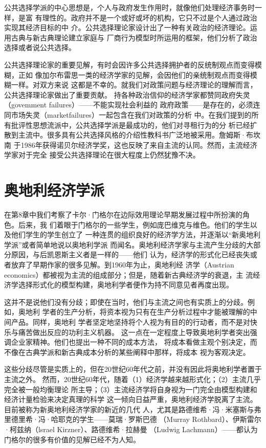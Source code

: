 公共选择学派的中心思想是，个人与政府发生作用时，就像他们处理经济事务时一样，是富
有理性的。政府并不是一个或好或坏的机构，它只不过是个人通过政治实现其经济目标的中
介。公共选择理论家设计出了一种有关政治的经济理论。运用古典与新古典理论建立家庭与
厂商行为模型时所运用的框架，他们分析了政治选择或者说公共选择。

公共选择理论家的重要见解，有时会因许多公共选择拥护者的反统制观点而变得模糊，正如
像加尔布雷思一类的经济学家的见解，会因他们的亲统制观点而变得模糊一样。对双方来说
这都是不幸的。就我们对政策问题与经济理论的理解而言，公共选择理论家做出了重要贡献。
持各种政治信仰的经济学家都赞同政府失灵（govemment failures）——不能实现社会利益的
政府政策——是存在的，必须连同市场失灵（marketfailures）一起包含在我们对政策的分析
中。在我们提到的所有批评性思想流派中，公共选择学派是最成功的，他们对寻租行为的分
析已经扩散到主流中。很多具有公共选择风格的介绍性教科书广泛地被采用。詹姆斯·布坎南
于1986年获得诺贝尔经济学奖，这也反映了来自主流的认同。然而，主流经济学家对于完全
接受公共选择理论在很大程度上仍然犹豫不决。


\section{奥地利经济学派}

在第8章中我们考察了卡尔·门格尔在边际效用理论早期发展过程中所扮演的角色。后来，我
们着眼于门格尔的一些学生，例如庞巴维克与维色。他们的学生以及他们学生的学生创立了
一种连贯的组织良好的经济学方法，并逐渐以“新奥地利学派”或者简单地说以奥地利学派
而闻名。奥地利经济学家与主流产生分歧的大部分原因，与后凯恩斯主义者是一样的——他们
认为，经济学的形式化已经丧失或者放弃了早期作家的很多见解。到1960年为止，奥地利经
济学（Austrian economics）都被视为主流的组成部分；但是，随着新古典经济学的衰退，主
流经济学选择形式化的模型构建，奥地利学者便作为持不同意见者再度出现。

这并不是说他们没有分歧；即使在当时，他们与主流之间也有实质上的分歧。例如，奥地利
学者的生产分析，将资本视为只有在生产分析过程中才能被理解的中间产品。同样，奥地利
学者坚定地坚持将个人视为有目的的行动者，而不是对快乐与痛苦做出反应的功利主义机器。
这一点在一定程度上导致奥地利学者突出强调企业家精神。他们也提出一种不同的成本方法，
将成本看做主观个别决定，而不像在古典学派和新古典成本分析的某些阐释中那样，将成本
视为客观决定。

这些分歧尽管是实质上的，但在20世纪60年代之前，并没有因此将奥地利学者置于主流之外。
然而，20世纪60年代，随着（1）经济学越来越形式化；（2）主流几乎完全被一般均衡理论
所主导；（3）主流经济学将自身视为一门完全由模型构建和经济计量检验来决定真理的科学
这一倾向日益严重，奥地利经济学脱离了主流。目前被称为新奥地利经济学家的新近的几代
人，尤其是路德维希·冯·米塞斯与弗里德里希·冯·哈耶克的学生——莫瑞·罗斯巴德
（Murray Rothbard）、伊斯雷尔·柯兹纳（lsrael Kirzner）、路德维希·拉赫曼
（Ludwig Lachmann）——都认为门格尔的很多有价值的见解已经不为人知。

